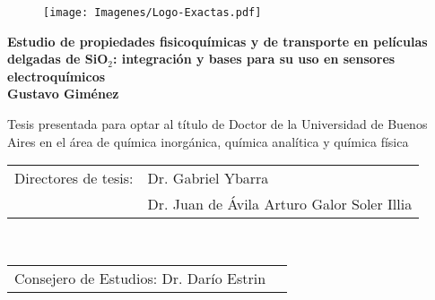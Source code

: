 \begin{titlepage}


		\begin{center}
		\end{center}

		\begin{figure}[ht!]
		\centering
		\texttt{[image: Imagenes/Logo-Exactas.pdf]}%
	 	\end{figure}

	 	\begin{center}
	 	\large{\bfseries{Estudio de propiedades fisicoquímicas y de transporte en películas delgadas de SiO$_2$: integración y bases para su uso en sensores electroquímicos}} \\ \vspace*{1.2cm}
	 	\Large{\bfseries{Gustavo Giménez}} \\ \vspace*{1.2cm}
	 	
	 	\normalsize{Tesis presentada para optar al título de Doctor de la Universidad de Buenos Aires en el área de química inorgánica, química analítica y química física} \\ 
	 	\end{center}
		
		\vspace*{1cm}

		\setlength\tabcolsep{1.5pt}
		\noindent\begin{tabular}{@{}ll}
		Directores de tesis:&Dr. Gabriel Ybarra\\  %
		 &Dr. Juan de Ávila Arturo Galor Soler Illia\\						%
		\end{tabular} \\
		\noindent\begin{tabular}{@{}ll}
		Consejero de Estudios: Dr. Darío Estrin \\ %
		\end{tabular} \\ 


\end{titlepage}
